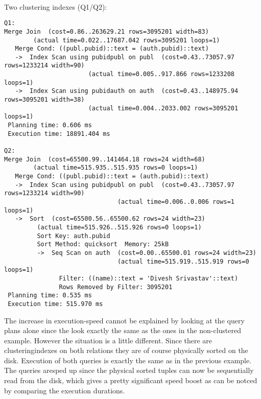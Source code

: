 \documentclass[11pt]{scrartcl}
\begin{document}
\\
\noindent Two clustering indexes  (Q1/Q2):
{\small
\begin{verbatim}
Q1:
Merge Join  (cost=0.86..263629.21 rows=3095201 width=83)
	    (actual time=0.022..17687.042 rows=3095201 loops=1)
   Merge Cond: ((publ.pubid)::text = (auth.pubid)::text)
   ->  Index Scan using pubidpubl on publ  (cost=0.43..73057.97 rows=1233214 width=90)
					   (actual time=0.005..917.866 rows=1233208 loops=1)
   ->  Index Scan using pubidauth on auth  (cost=0.43..148975.94 rows=3095201 width=38)
					   (actual time=0.004..2033.002 rows=3095201 loops=1)
 Planning time: 0.606 ms
 Execution time: 18891.404 ms

Q2:
Merge Join  (cost=65500.99..141464.18 rows=24 width=68)
	    (actual time=515.935..515.935 rows=0 loops=1)
   Merge Cond: ((publ.pubid)::text = (auth.pubid)::text)
   ->  Index Scan using pubidpubl on publ  (cost=0.43..73057.97 rows=1233214 width=90)
    				           (actual time=0.006..0.006 rows=1 loops=1)
   ->  Sort  (cost=65500.56..65500.62 rows=24 width=23)
	     (actual time=515.926..515.926 rows=0 loops=1)
         Sort Key: auth.pubid
         Sort Method: quicksort  Memory: 25kB
         ->  Seq Scan on auth  (cost=0.00..65500.01 rows=24 width=23)
                               (actual time=515.919..515.919 rows=0 loops=1)
               Filter: ((name)::text = 'Divesh Srivastav'::text)
               Rows Removed by Filter: 3095201
 Planning time: 0.535 ms
 Execution time: 515.970 ms
\end{verbatim}
The increase in execution-speed cannot be explained by looking at the query plans alone since the look exactly the same as the ones in the non-clustered example. However the situation is a little different.
Since there are clusteringindexes on both relations they are of course physically sorted on the disk. Execution of both queries is exactly the same as in the previous example.
The queries aresped up since the physical sorted tuples can now be sequentially read from the disk, which gives a pretty significant speed boost as can be notced by comparing the execution durations.
}
\end{document}
